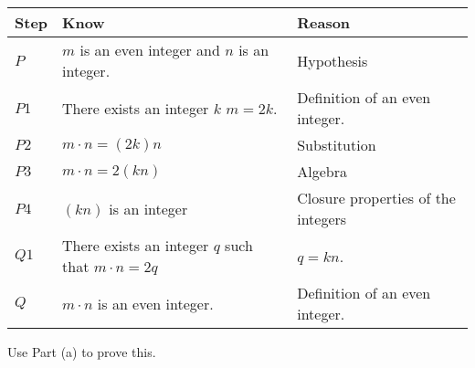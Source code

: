 \begin{list}{\bf{\ref{exer:evenoddadd}.}}
\begin{list}{\bf{(c)}}
\end{list}
\end{list}


\begin{list}{\bf{\ref{exer:evenoddmult}.}}
\item \begin{list}{\bf{(a)}} \item
\begin{tabular}[t]{|p{0.4in}|p{1.6in}|p{1.6in}|}
  \hline
  \textbf{Step}  &  \textbf{Know}  &  \textbf{Reason} \\ \hline
  $P$  &  $m$ is an even integer and $n$ is an integer.  &  Hypothesis \\ \hline
  $P1$ &  There exists an integer $k$ $m = 2k$.    &  Definition of an even integer. \\ \hline
  $P2$  &  $m \cdot n = \left( 2k \right) n$  &  Substitution \\ \hline
  $P3$  &  $m \cdot n = 2 \left( {kn} \right)$  &  Algebra  \\ \hline
  $P4$  &  $\left( {kn} \right)$ is an integer  &  Closure properties of the integers \\ \hline
  $Q1$  &  There exists an integer $q$ such that $m \cdot n = 2q$  & $q = kn$.  \\ \hline
  $Q$  &  $m \cdot n$ is an even integer. &  Definition of an even integer. \\ \hline
\end{tabular}
\end{list}

\end{list}
%
%
\begin{list}{}
\item \begin{list}{\bf{(b)}}
\item Use Part (a) to prove this.
\end{list}
\end{list}

